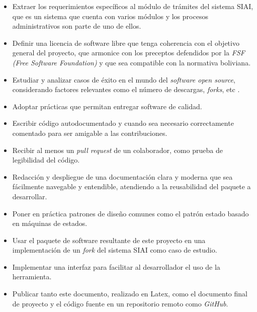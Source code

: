 \begin{itemize}
	\item Extraer los requerimientos específicos al módulo de trámites del
	      sistema SIAI, que es un sistema que cuenta con varios módulos y los
	      procesos administrativos son parte de uno de ellos.

	\item Definir una licencia de software libre que tenga coherencia con el
	      objetivo general del proyecto, que armonice con los preceptos defendidos
	      por la \textit{FSF (Free Software Foundation)} y que sea compatible con la
	      normativa boliviana.

	\item Estudiar y analizar casos de éxito en el mundo del \textit{software open
	      source}, considerando factores relevantes como el número de descargas,
	      \textit{forks}, etc \cite{mujahidWhatAreCharacteristics2023}.

	\item Adoptar prácticas que permitan entregar software de calidad.

	\item Escribir código autodocumentado y cuando sea necesario correctamente
	      comentado para ser amigable a las contribuciones.

	\item Recibir al menos un \textit{pull request} de un colaborador, como prueba de
	      legibilidad del código.

	\item Redacción y despliegue de una documentación clara y moderna que sea
	      fácilmente navegable y entendible, atendiendo a la reusabilidad del
	      paquete a desarrollar.

	\item Poner en práctica patrones de diseño comunes como el patrón estado
	      basado en máquinas de estados.

	\item Usar el paquete de software resultante de este proyecto en una
	      implementación de un \textit{fork} del sistema SIAI como caso de estudio.

	\item Implementar una interfaz para facilitar al desarrollador el uso de la
	      herramienta.

	\item Publicar tanto este documento, realizado en Latex, como el documento
	      final de proyecto y el código fuente en un repositorio remoto como
		  \textit{GitHub}.


\end{itemize}
